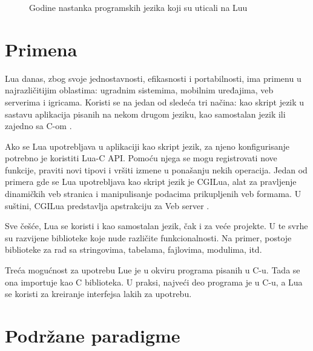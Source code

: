 \documentclass[a4paper]{article}
\begin{document}

\begin{figure}
\label{godine}
\caption{Godine nastanka programskih jezika koji su uticali na Luu}
\end{figure}

\section{Primena}	
\label{sec:primena}


Lua danas, zbog svoje jednostavnosti, efikasnosti i portabilnosti, ima primenu u najrazličitijim oblastima: ugradnim sistemima, mobilnim  uređajima, veb serverima i igricama. Koristi se na jedan od sledeća tri načina: kao skript jezik u sastavu aplikacija pisanih na nekom drugom jeziku, kao samostalan jezik ili zajedno sa C-om \cite{bookProgInLua}.

Ako se Lua upotrebljava u aplikaciji kao skript jezik, za njeno konfigurisanje potrebno je koristiti Lua-C API. Pomoću njega se mogu registrovati nove funkcije, praviti novi tipovi i vršiti izmene u ponašanju nekih operacija. Jedan od primera gde se Lua upotrebljava kao skript jezik je CGILua, alat za pravljenje dinamičkih veb stranica i manipulisanje podacima prikupljenih veb formama. U suštini, CGILua predstavlja apstrakciju za Veb server \cite{keplerProject}.

Sve češće, Lua se koristi i kao samostalan jezik, čak i za veće projekte. U te svrhe su razvijene biblioteke koje nude različite funkcionalnosti. Na primer, postoje biblioteke za rad sa stringovima, tabelama, fajlovima, modulima, itd.

Treća mogućnost za upotrebu Lue je u okviru programa pisanih u C-u. Tada se ona importuje kao C biblioteka. U praksi, najveći deo programa je u C-u, a Lua se koristi za kreiranje interfejsa lakih za upotrebu.


\section{Podržane paradigme}
\label{sec:paradigme}
\end{document}
